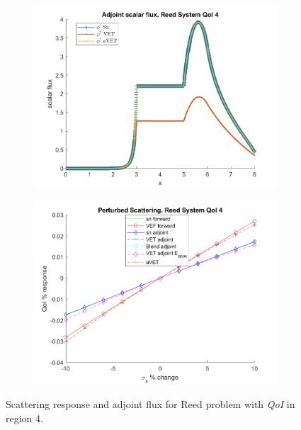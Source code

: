 \documentclass[12pt]{report}
\newcommand{\qoi}{{\it QoI}\xspace}
\begin{document}
\begin{figure}[H]
\centering
\begin{subfigure}{.5\textwidth}
  \centering
  \includegraphics[width=.98\linewidth]{figures2/773phia.png}
\end{subfigure}%
\begin{subfigure}{.5\textwidth}
  \centering
  \includegraphics[width=.98\linewidth]{figures2/773sigsSens.png}
\end{subfigure}
\caption{Scattering response and adjoint flux for Reed problem with \qoi in region 4.}
\label{Reed4}
\end{figure}
%
\end{document}
